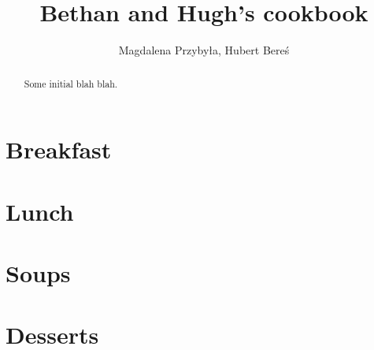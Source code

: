 \documentclass[%
twoside,
11pt
]{article}
\begin{document}
\title{Bethan and Hugh's cookbook}
\author{Magdalena Przybyła, Hubert Bereś}
\maketitle

\begin{abstract}
    Some initial blah blah.
\end{abstract}

\tableofcontents

\vspace{5em}
\newpage

\section{Breakfast}


\newpage

\newpage

\newpage

\newpage

\newpage

\newpage

\section{Lunch}


\newpage

\newpage

\newpage

\newpage

\newpage

\newpage

\newpage

\section{Soups}


\newpage

\newpage

\newpage

\newpage

\newpage

\section{Desserts}

\newpage

\newpage

\newpage

\newpage

\newpage

\newpage

\newpage

\newpage
\end{document}
